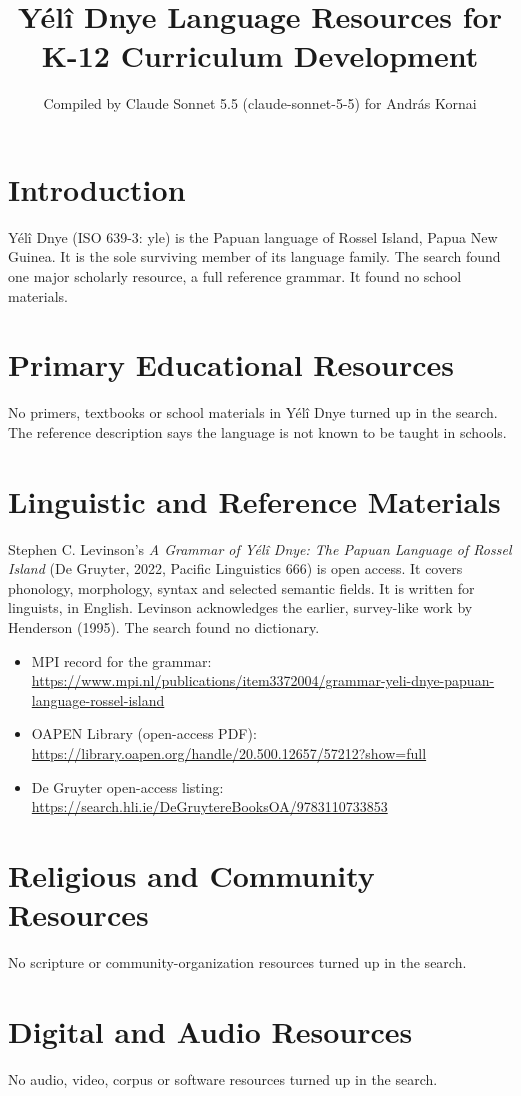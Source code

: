 \documentclass[12pt]{article}
\title{Y\'el\^i Dnye Language Resources for K-12 Curriculum Development}
\author{Compiled by Claude Sonnet 5.5 (claude-sonnet-5-5) for Andr\'as Kornai}
\date{}
\begin{document}
\maketitle

\section{Introduction}
Y\'el\^i Dnye (ISO 639-3: yle) is the Papuan language of Rossel Island, Papua New Guinea. It is the sole surviving member of its language family. The search found one major scholarly resource, a full reference grammar. It found no school materials.

\section{Primary Educational Resources}
No primers, textbooks or school materials in Y\'el\^i Dnye turned up in the search. The reference description says the language is not known to be taught in schools.

\section{Linguistic and Reference Materials}
Stephen C. Levinson's \emph{A Grammar of Y\'el\^i Dnye: The Papuan Language of Rossel Island} (De Gruyter, 2022, Pacific Linguistics 666) is open access. It covers phonology, morphology, syntax and selected semantic fields. It is written for linguists, in English. Levinson acknowledges the earlier, survey-like work by Henderson (1995). The search found no dictionary.
\begin{itemize}
\item MPI record for the grammar: \url{https://www.mpi.nl/publications/item3372004/grammar-yeli-dnye-papuan-language-rossel-island}
\item OAPEN Library (open-access PDF): \url{https://library.oapen.org/handle/20.500.12657/57212?show=full}
\item De Gruyter open-access listing: \url{https://search.hli.ie/DeGruytereBooksOA/9783110733853}
\end{itemize}

\section{Religious and Community Resources}
No scripture or community-organization resources turned up in the search.

\section{Digital and Audio Resources}
No audio, video, corpus or software resources turned up in the search.
\end{document}
